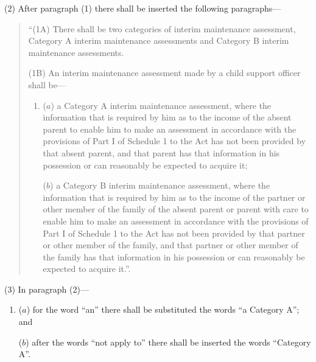 \documentclass[12pt,a4paper]{article}
\begin{document}
(2) After paragraph (1) there shall be inserted the following paragraphs---
\begin{quotation}
“(1A) There shall be two categories of interim maintenance assessment, Category A interim maintenance assessments and Category B interim maintenance assessments. 

(1B) An interim maintenance assessment made by a child support officer shall be---
\begin{enumerate}\item[]
($a$) a Category A interim maintenance assessment, where the information that is required by him as to the income of the absent parent to enable him to make an assessment in accordance with the provisions of Part I of Schedule 1 to the Act has not been provided by that absent parent, and that parent has that information in his possession or can reasonably be expected to acquire it;

($b$) a Category B interim maintenance assessment, where the information that is required by him as to the income of the partner or other member of the family of the absent parent or parent with care to enable him to make an assessment in accordance with the provisions of Part I of Schedule 1 to the Act has not been provided by that partner or other member of the family, and that partner or other member of the family has that information in his possession or can reasonably be expected to acquire it.”.
\end{enumerate}
\end{quotation}

(3) In paragraph (2)---
\begin{enumerate}\item[]
($a$) for the word “an” there shall be substituted the words “a Category A”; and

($b$) after the words “not apply to” there shall be inserted the words “Category A”.
\end{enumerate}
\end{document}
